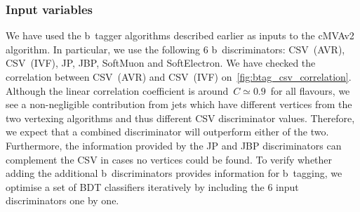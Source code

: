 \subsubsection{Input variables}
We have used the b~tagger algorithms described earlier as inputs to the cMVAv2 algorithm. In particular, we use the following 6 b~discriminators: CSV~(AVR), CSV~(IVF), JP, JBP, SoftMuon and SoftElectron. We have checked the correlation between CSV~(AVR) and CSV~(IVF) on~\cref{fig:btag_csv_correlation}. Although the linear correlation coefficient is around~$C \simeq 0.9$~for all flavours, we see a non-negligible contribution from jets which have different vertices from the two vertexing algorithms and thus different CSV discriminator values. Therefore, we expect that a combined discriminator will outperform either of the two. Furthermore, the information provided by the JP and JBP discriminators can complement the CSV in cases no vertices could be found. To verify whether adding the additional b~discriminators provides information for b~tagging, we optimise a set of BDT classifiers iteratively by including the 6 input discriminators one by one.


